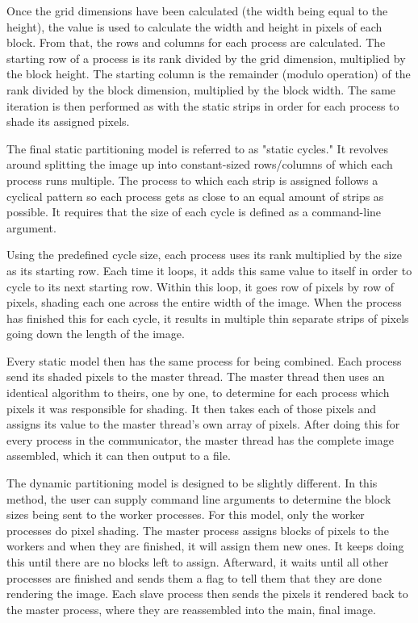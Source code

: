 \documentclass[CMPE]{KGCOEReport}
\begin{document}
Once the grid dimensions have been calculated (the width being equal to the height), 
the value is used to calculate the width and height in pixels of each block. From that, 
the rows and columns for each process are calculated. The starting row of a process is 
its rank divided by the grid dimension, multiplied by the block height. The starting column 
is the remainder (modulo operation) of the rank divided by the block dimension, multiplied 
by the block width. The same iteration is then performed as with the static strips in 
order for each process to shade its assigned pixels.

The final static partitioning model is referred to as "static cycles." It revolves around 
splitting the image up into constant-sized rows/columns of which each process runs multiple. 
The process to which each strip is assigned follows a cyclical pattern so each process gets 
as close to an equal amount of strips as possible. It requires that the size of each cycle 
is defined as a command-line argument.

Using the predefined cycle size, each process uses its rank multiplied by the size as its 
starting row. Each time it loops, it adds this same value to itself in order to cycle to 
its next starting row. Within this loop, it goes row of pixels by row of pixels, shading 
each one across the entire width of the image. When the process has finished this for each 
cycle, it results in multiple thin separate strips of pixels going down the length of the image.

Every static model then has the same process for being combined. Each process send its shaded 
pixels to the master thread. The master thread then uses an identical algorithm to theirs, one 
by one, to determine for each process which pixels it was responsible for shading. It then 
takes each of those pixels and assigns its value to the master thread's own array of pixels. 
After doing this for every process in the communicator, the master thread has the complete 
image assembled, which it can then output to a file.

The dynamic partitioning model is designed to be slightly different. In this method, the user 
can supply command line arguments to determine the block sizes being sent to the worker 
processes. For this model, only the worker processes do pixel shading. The master process 
assigns blocks of pixels to the workers and when they are finished, it will assign them new ones. 
It keeps doing this until there are no blocks left to assign. Afterward, it waits until all 
other processes are finished and sends them a flag to tell them that they are done rendering 
the image. Each slave process then sends the pixels it rendered back to the master process, where 
they are reassembled into the main, final image.
\end{document}
